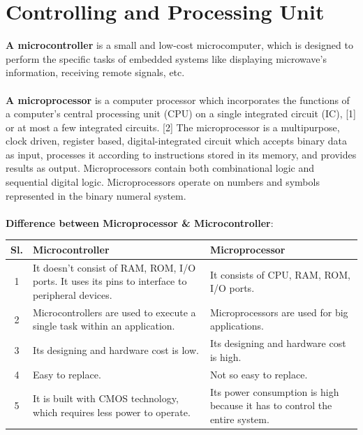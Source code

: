\section{Controlling and Processing Unit}

\textbf{A microcontroller} is a small and low-cost microcomputer, which is designed to perform the specific tasks of embedded systems like displaying microwave’s information, receiving remote signals, etc.
\\
\\
\textbf{A microprocessor} is a computer processor which incorporates the functions of a computer's central processing unit (CPU) on a single integrated circuit (IC), [1] or at most a few integrated circuits. [2] The microprocessor is a multipurpose, clock driven, register based, digital-integrated circuit which accepts binary data as input, processes it according to instructions stored in its memory, and provides results as output. Microprocessors contain both combinational logic and sequential digital logic. Microprocessors operate on numbers and symbols represented in the binary numeral system.
\\
\\
\textbf{Difference between Microprocessor \& Microcontroller}:

\begin{center}
 \begin{tabular}{| c |  p{6cm} | p{6cm} |} 
 \hline
 Sl. & Microcontroller & Microprocessor \\ [0.5ex] 
 \hline\hline
 1 & It doesn’t consist of RAM, ROM, I/O ports. It uses its pins to interface to peripheral devices. & It consists of CPU, RAM, ROM, I/O ports. \\ 
 \hline
 2 & Microcontrollers are used to execute a single task within an application. &  Microprocessors are used for big applications. \\
 \hline
 3 & Its designing and hardware cost is low. & Its designing and hardware cost is high. \\
 \hline
 4 & Easy to replace. & Not so easy to replace. \\
 \hline
 5 & It is built with CMOS technology, which requires less power to operate. & Its power consumption is high because it has to control the entire system. \\
 \hline
\end{tabular}
\end{center}

